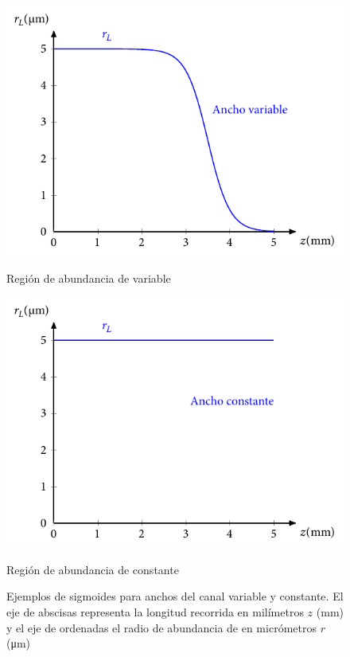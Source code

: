 \begin{figure}[htbp]
  \centering
  \begin{subcaptionblock}{.4\textwidth}
    \centering
    \includegraphics[width=\textwidth]{Figuras/ch4_ejsigm1.pdf}
    \caption{Región de abundancia de  variable}\label{fig:ch4_sigma}
  \end{subcaptionblock}
  \begin{subcaptionblock}{.4\textwidth}
    \centering
    \includegraphics[width=\textwidth]{Figuras/ch4_ejsigm2.pdf}
    \caption{Región de abundancia de  constante}\label{fig:ch4_sigmb}
  \end{subcaptionblock}
   \caption{Ejemplos de sigmoides para anchos del canal variable y constante. El eje de abscisas representa la longitud recorrida en milímetros $z$ (\unit{mm}) y el eje de ordenadas el radio de abundancia de  en micrómetros $r$ (\unit{\um})}
   \label{fig:4.3}
\end{figure}

